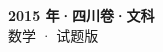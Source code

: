\documentclass[zihao=-4, a4paper]{ctexart}
\begin{document}
\begin{center}
  {\Large\bfseries 2015 年·四川卷·文科}\\[4pt]
  {\large 数学 · 试题版}
\end{center}
\medskip
{}

\end{document}
